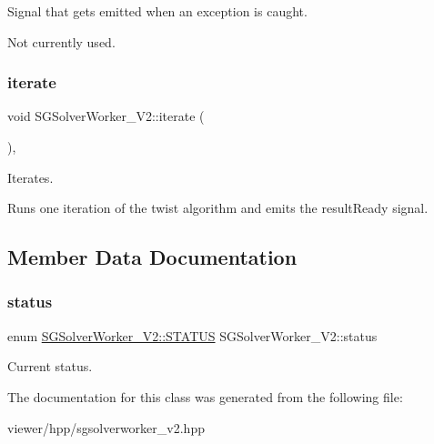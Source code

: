 Signal that gets emitted when an exception is caught. 

Not currently used. \mbox{\label{classSGSolverWorker__V2_a3b7099cf8b559184743bca1eba3fa00e}} 
\subsubsection{\texorpdfstring{iterate}{iterate}}
{\footnotesize\ttfamily void S\+G\+Solver\+Worker\+\_\+\+V2\+::iterate (\begin{DoxyParamCaption}{ }\end{DoxyParamCaption})\hspace{0.3cm}{\ttfamily [inline]}, {\ttfamily [slot]}}



Iterates. 

Runs one iteration of the twist algorithm and emits the result\+Ready signal. 

\subsection{Member Data Documentation}
\mbox{\label{classSGSolverWorker__V2_a87eb50e8f1b9c3740cf92de43c995023}} 
\subsubsection{\texorpdfstring{status}{status}}
{\footnotesize\ttfamily enum \hyperlink{classSGSolverWorker__V2_a252099560187dceadfe97c1bd335c561}{S\+G\+Solver\+Worker\+\_\+\+V2\+::\+S\+T\+A\+T\+US}  S\+G\+Solver\+Worker\+\_\+\+V2\+::status}

Current status. 

The documentation for this class was generated from the following file\+:\begin{DoxyCompactItemize}
\item 
viewer/hpp/sgsolverworker\+\_\+v2.\+hpp\end{DoxyCompactItemize}
